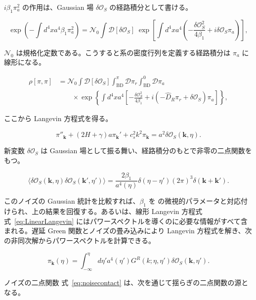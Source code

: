 \documentclass[a4paper,11pt]{ltjsarticle}
\numberwithin{equation}{section}
\def\pia{\pi_{a}}
\def\pir{\pi_{r}}
\def\bfk{\textbf{k}}
\newcommand{\Os}{\delta \mathcal{O}_{S}}
\newcommand{\Eq}[1]{Eq.~(\ref{#1})}
\newcommand{\Eqs}[1]{Eqs.~(\ref{#1})}
\renewcommand{\Eq}[1]{式~\eqref{#1}}
\renewcommand{\Eqs}[1]{式~\eqref{#1}}
\begin{document}
$i\beta_1\pia^2$ の作用は、Gaussian 場 $\Os$ の経路積分として書ける。

\begin{equation}\label{eq:HStrick}
    \exp\left(-\int d^{4}x a^{4}\beta_{1}\pia^{2}\right)=\mathcal{N}_{0}\int\mathcal{D}[\Os]\;\exp\left[\int d^{4}x a^{4}\left(-\frac{\Os^{2}}{4\beta_{1}}+i\Os\pia\right)\right],
\end{equation}

$\mathcal N_0$ は規格化定数である。こうすると系の密度行列を定義する経路積分は $\pia$ に線形になる。

\begin{align}
    \rho[\pi,\pi]&=                \mathcal{N}_{0}\int\mathcal{D}[\Os]\int_{\text{BD}}^{\pi}\mathcal{D}\pir\int_{\text{BD}}^{0}\mathcal{D}\pia  \\
    & \qquad \times \exp\left\{\int d^{4}x a^{4}\left[-\frac{\Os^{2}}{4\beta_{1}}+i\left(-\widehat{D}_{R}\pir+\Os\right)\pia\right]\right\},\nonumber
\end{align}

ここから Langevin 方程式を得る。

\begin{equation}\label{eq:LinearLangevin}
    \pi''_{\bfk} +\left( 2H + \gamma\right)a\pi_{\bfk}'+c_{s}^{2}k^{2}\pi_{\bfk}=a^2 \Os(\bfk, \eta).
\end{equation}

新変数 $\Os$ は Gaussian 場として振る舞い、経路積分のもとで非零の二点関数をもつ。

\begin{equation}\label{eq:noisecontact}
    \langle\Os(\bfk,\eta)\Os(\bfk',\eta')\rangle=\frac{2\beta_{1}}{a^{4}(\eta)}\delta(\eta-\eta')(2\pi)^3\delta(\bfk+\bfk').
\end{equation}

このノイズの Gaussian 統計を比較すれば、$\beta_1$ を \cite{Creminelli:2023aly} の微視的パラメータと対応付けられ、上の結果を回復する。あるいは、線形 Langevin 方程式 \Eqs{eq:LinearLangevin} にはパワースペクトルを導くのに必要な情報がすべて含まれる。遅延 Green 関数とノイズの畳み込みにより Langevin 方程式を解き、次の非同次解からパワースペクトルを計算できる。

\begin{equation}\label{eq:GRxifree}
    \pi_{\bfk}(\eta)=\int_{-\infty}^{\eta}d\eta'a^{4}(\eta')G^R(k;\eta,\eta')\Os(\bfk,\eta').
\end{equation}

ノイズの二点関数 \Eq{eq:noisecontact} は、次を通じて揺らぎの二点関数の源となる。
\end{document}
